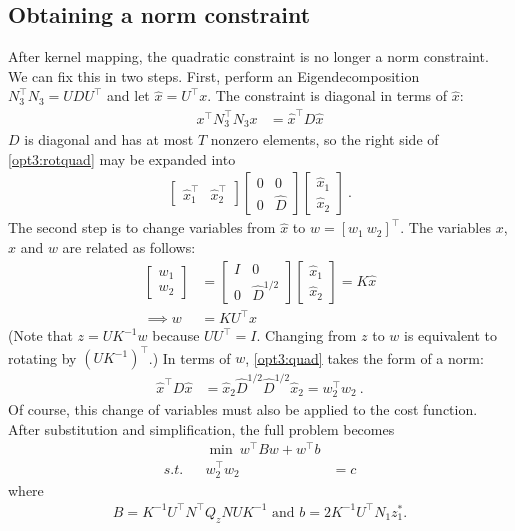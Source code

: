 \documentclass[conference]{IEEEtran}
\begin{document}
\subsection{Obtaining a norm constraint}

After kernel mapping, the quadratic constraint is no longer a norm constraint. We can fix this in two steps. First, perform an Eigendecomposition $N_3^\top N_3 = UDU^\top$ and let $\hat{x} = U^\top x$. The constraint is diagonal in terms of $\hat{x}$:
\begin{align}
\label{opt3:rotquad} x^\top N_3^\top N_3 x &= \hat{x}^\top D\hat{x}
\end{align}
$D$ is diagonal and has at most $T$ nonzero elements, so the right side of \eqref{opt3:rotquad} may be expanded into
\begin{align}
\begin{bmatrix}
\hat{x}_1^\top & \hat{x}_2^\top \end{bmatrix}
\begin{bmatrix} 0 & 0 \\ 0 & \hat{D} \end{bmatrix}
\begin{bmatrix}
\hat{x}_1 \\ \hat{x}_2
\end{bmatrix}~.
\end{align}
The second step is to change variables from $\hat{x}$ to $w = [w_1~w_2]^\top$. The variables $x$, $\hat{x}$ and $w$ are related as follows:
\begin{align}
\label{eq:x_to_w} \begin{bmatrix} w_1 \\ w_2 \end{bmatrix} &=
\begin{bmatrix} I & 0 \\ 0 & \hat{D}^{1/2} \end{bmatrix}
\begin{bmatrix} \hat{x}_1 \\ \hat{x}_2 \end{bmatrix} = K\hat{x} \\
\nonumber \implies w &= KU^\top x
\end{align}
(Note that $z = UK^{-1}w$ because $UU^\top = I$. Changing from $z$ to $w$
is equivalent to rotating by $(UK^{-1})^\top$.) In terms of $w$, \eqref{opt3:quad} takes the form of a norm:
\begin{align}
\hat{x}^\top D\hat{x} &= \hat{x}_2\hat{D}^{1/2}\hat{D}^{1/2}\hat{x}_2 = w_2^\top w_2~.
\end{align}
Of course, this change of variables must also be applied to the cost function. After substitution and simplification, the full problem becomes
\begin{subequations}\label{opt4}
\begin{align}
\label{opt4:obj} && \min~ w^\top Bw + w^\top b \\
\label{opt4:quad} s.t. && w_2^\top w_2 &= c
\end{align}
\end{subequations}
where 
\begin{align*}
B= K^{-1}U^\top N^\top Q_z NUK^{-1} \text{ and }b=2 K^{-1}U^\top N_1z_1^*.
\end{align*}
\end{document}
